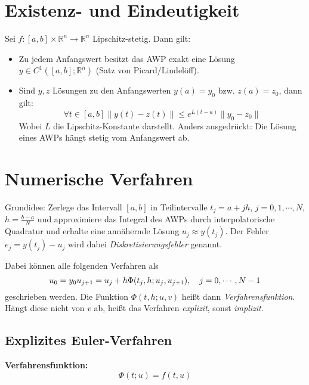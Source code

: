 \documentclass[a4paper, 11pt, accentcolor = tud3b]{tudreport}
\newcommand{\norm}[1]{\ensuremath{\lVert #1 \rVert}}
\newcommand{\R}{\ensuremath{\mathbb{R}}}
\begin{document}
	    \section{Existenz- und Eindeutigkeit}
	        Sei \( f : [a, b] \times \R^n \rightarrow \R^n \) Lipschitz-stetig. Dann gilt:
	        \begin{itemize}
	        	\item Zu jedem Anfangswert besitzt das AWP exakt eine Lösung \( y \in C^1([a, b]; \R^n) \) (Satz von Picard/Lindelöff).
	        	\item Sind \( y, z \) Lösungen zu den Anfangswerten \( y(a) = y_0 \) bzw. \( z(a) = z_0 \), dann gilt:
		        	\begin{equation*}
			        	\forall t \in [a, b] \norm{y(t) - z(t)} \leq e ^ { L(t-a) } \norm{y_0 - z_0}
		        	\end{equation*}
		        	Wobei \(L\) die Lipschitz-Konstante darstellt. Anders ausgedrückt: Die Lösung eines AWPs hängt stetig vom Anfangswert ab.
	        \end{itemize}
	
	    \section{Numerische Verfahren}
	        Grundidee: Zerlege das Intervall \([a,b]\) in Teilintervalle \( t_j = a + jh \), \( j = 0, 1, \cdots, N \), \( h = \frac{b-a}{N} \) und approximiere das Integral des AWPs durch interpolatorische Quadratur und erhalte eine annähernde Lösung \( u_j \approx y(t_j) \). Der Fehler \( e_j = y(t_j) - u_j \) wird dabei \textit{Diskretisierungsfehler} genannt.
	
			Dabei können alle folgenden Verfahren als
			\begin{equation*}
				u_0 = y_0 \\
				u_{j+1} = u_j + h \Phi(t_j, h; u_j, u_{j+1}), \quad j = 0, \cdots, N - 1
			\end{equation*}
			geschrieben werden. Die Funktion \( \Phi(t, h; u, v) \) heißt dann \textit{Verfahrensfunktion}. Hängt diese nicht von \(v\) ab, heißt das Verfahren \textit{explizit}, sonst \textit{implizit}.
	
	        \subsection{Explizites Euler-Verfahren}
		        \textbf{Verfahrensfunktion:}
		        \begin{equation*}
			        \Phi(t; u) = f(t, u)
		        \end{equation*}
		        
\end{document}
